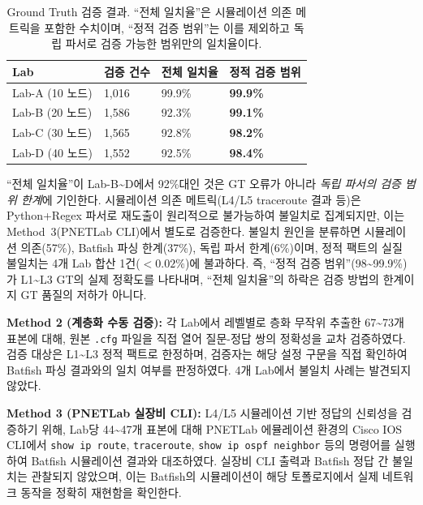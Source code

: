 \documentclass[journal]{IEEEtran}
\begin{document}
\begin{table}[!t]
  \caption{Ground Truth 검증 결과. ``전체 일치율''은 시뮬레이션 의존 메트릭을 포함한 수치이며, ``정적 검증 범위''는 이를 제외하고 독립 파서로 검증 가능한 범위만의 일치율이다.}
  \label{tab:gt-validation}
  \centering
  \small
  \begin{tabular}{|L{2.1cm}|C{1.2cm}|C{1.2cm}|C{1.5cm}|}
    \hline
    \textbf{Lab}  & \textbf{검증 건수} & \textbf{전체 일치율} & \textbf{정적 검증 범위} \\
    \hline
    Lab-A (10 노드) & 1,016          & 99.9\%          & \textbf{99.9\%}   \\
    \hline
    Lab-B (20 노드) & 1,586          & 92.3\%          & \textbf{99.1\%}   \\
    \hline
    Lab-C (30 노드) & 1,565          & 92.8\%          & \textbf{98.2\%}   \\
    \hline
    Lab-D (40 노드) & 1,552          & 92.5\%          & \textbf{98.4\%}   \\
    \hline
  \end{tabular}
\end{table}

``전체 일치율''이 Lab-B\textasciitilde D에서 92\%대인 것은 GT 오류가 아니라 \emph{독립 파서의 검증 범위 한계}에 기인한다. 시뮬레이션 의존 메트릭(L4/L5 traceroute 결과 등)은 Python+Regex 파서로 재도출이 원리적으로 불가능하여 불일치로 집계되지만, 이는 Method~3(PNETLab CLI)에서 별도로 검증한다. 불일치 원인을 분류하면 시뮬레이션 의존(57\%), Batfish 파싱 한계(37\%), 독립 파서 한계(6\%)이며, 정적 팩트의 실질 불일치는 4개 Lab 합산 1건($<0.02\%$)에 불과하다. 즉, ``정적 검증 범위''(98\textasciitilde99.9\%)가 L1\textasciitilde L3 GT의 실제 정확도를 나타내며, ``전체 일치율''의 하락은 검증 방법의 한계이지 GT 품질의 저하가 아니다.

\textbf{Method 2 (계층화 수동 검증):} 각 Lab에서 레벨별로 층화 무작위 추출한 67\textasciitilde73개 표본에 대해, 원본 \texttt{.cfg} 파일을 직접 열어 질문-정답 쌍의 정확성을 교차 검증하였다. 검증 대상은 L1\textasciitilde L3 정적 팩트로 한정하며, 검증자는 해당 설정 구문을 직접 확인하여 Batfish 파싱 결과와의 일치 여부를 판정하였다. 4개 Lab에서 불일치 사례는 발견되지 않았다.

\textbf{Method 3 (PNETLab 실장비 CLI):} L4/L5 시뮬레이션 기반 정답의 신뢰성을 검증하기 위해, Lab당 44\textasciitilde47개 표본에 대해 PNETLab 에뮬레이션 환경의 Cisco IOS CLI에서 \texttt{show ip route}, \texttt{traceroute}, \texttt{show ip ospf neighbor} 등의 명령어를 실행하여 Batfish 시뮬레이션 결과와 대조하였다. 실장비 CLI 출력과 Batfish 정답 간 불일치는 관찰되지 않았으며, 이는 Batfish의 시뮬레이션이 해당 토폴로지에서 실제 네트워크 동작을 정확히 재현함을 확인한다.
\end{document}
